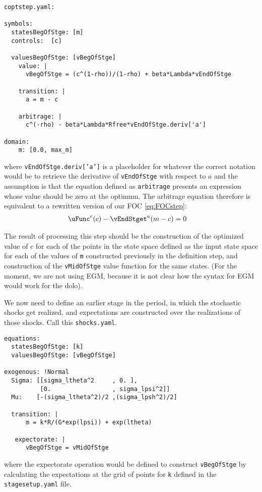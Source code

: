 \documentclass[SolvingMicroDSOPs]{subfiles}
\begin{document}
\begin{verbatim}
coptstep.yaml:

symbols:
  statesBegOfStge: [m]
  controls:  [c]

  valuesBegOfStge: [vBegOfStge]
    value: |
      vBegOfStge = (c^(1-rho))/(1-rho) + beta*Lambda*vEndOfStge

    transition: |
      a = m - c

    arbitrage: |
      c^(-rho) - beta*Lambda*Rfree*vEndOfStge.deriv['a'] 

domain:
    m: [0.0, max_m]

\end{verbatim}
where \texttt{vEndOfStge.deriv['a']} is a placeholder for whatever the correct notation would be to retrieve the derivative of \texttt{vEndOfStge} with respect to $a$ and the assumption is that the equation defined as \texttt{arbitrage} presents an expression whose value should be zero at the optimum.  The arbitrage equation therefore is equivalent to a rewritten version of our FOC \eqref{eq:FOCstep}:
\begin{align}
  \uFunc^{{c}}(c) - \vEndStget^{{a}}(m-c) & = 0
\end{align}

The result of processing this step should be the construction of the optimized value of $c$ for each of the points in the state space defined as the input state space for each of the values of \texttt{m} constructed previously in the definition step, and construction of the \texttt{vMidOfStge} value function for the same states. (For the moment, we are not using EGM, because it is not clear how the syntax for EGM would work for the dolo).

We now need to define an earlier stage in the period, in which the stochastic shocks get realized, and expectations are constructed over the realizations of those shocks.  Call this \texttt{shocks.yaml}.

\begin{verbatim}
equations:
  statesBegOfStge: [k]
  valuesBegOfStge: [vBegOfStge]

exogenous: !Normal
  Sigma: [[sigma_ltheta^2     , 0. ],
          [0.                 , sigma_lpsi^2]]
  Mu:    [-(sigma_ltheta^2)/2 ,(sigma_lpsh^2)/2]

  transition: |
      m = k*R/(G*exp(lpsi)) + exp(ltheta)

   expectorate: |
      vBegOfStge = vMidOfStge
\end{verbatim}
where the expectorate operation would be defined to construct \texttt{vBegOfStge} by calculating the expectations at the grid of points for \texttt{k} defined in the \texttt{stagesetup.yaml} file.
\end{document}
